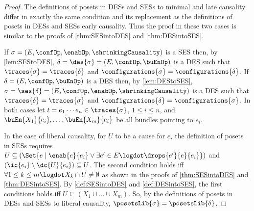\documentclass[runningheads,a4paper]{llncs}
\begin{document}
\begin{proof}
	The definitions of posets in DESs and SESs \wrt to minimal and late causality
	differ in exactly the same condition and its replacement as the definitions of
	posets in DESs and SESs \wrt early causality. Thus the proof in these two cases is similar to the proofs of \ths\ref{thm:SESintoDES} and \ref{thm:DESintoSES}.
	
	If $ \sigma = \left( E, \confOp, \enabOp, \shrinkingCausality \right) $ is a SES then, by \lem\ref{lem:SEStoDES}, $ \delta = \des{\sigma} = \left( E, \confOp, \buEnOp \right) $ is a DES such that $ \traces{\sigma} = \traces{\delta} $ and $ \configurations{\sigma} = \configurations{\delta} $.
	If $ \delta = \left( E, \confOp, \buEnOp \right) $ is a DES then, by \lem\ref{lem:DEStoSES}, $ \sigma = \ses{\delta} = \left( E, \confOp, \enabOp, \shrinkingCausality \right) $ is a DES such that $ \traces{\delta} = \traces{\sigma} $ and $ \configurations{\delta} = \configurations{\sigma} $.
	In both cases let $ t = e_1 \cdots e_n \in \traces{\sigma} $, $ 1 \leq i \leq n $, and $ \buEn{X_1}{e_i}, \ldots, \buEn{X_m}{e_i} $ be all bundles pointing to $ e_i $.
	
	In the case of liberal causality, for $ U $ to be a cause for $ e_i $ the
	definition of posets in SESs requires $ U \subseteq \left( \Set{ e \mid \enab{e}{e_i} \lor \exists e' \in E \logdot \drops{e'}{e}{e_i} } \right) $ and $ ( \ic{e_i} \setminus \dc{U}{e_i} ) \subseteq U $.
	The second condition holds iff $ \forall 1 \leq k \leq m \logdot X_k \cap U \neq \emptyset $ as shown in the proofs of \ths\ref{thm:SESintoDES} and \ref{thm:DESintoSES}.
	By \ref{def:SESintoDES} and \ref{def:DESintoSES}, the first conditions holds iff $ U \subseteq \left( X_1 \cup \ldots \cup X_m \right) $.
	So, by the definitions of posets in DESs and SESs \wrt to liberal causality, $
	\posetsLib{\sigma} = \posetsLib{\delta} $.
\end{proof}
\end{document}
